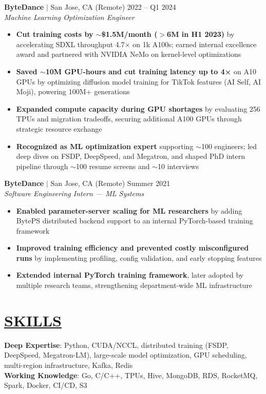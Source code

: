\documentclass[overlapped,line,11pt]{res}
\begin{document}
\begin{resume}
\textbf{ByteDance} $|$ San Jose, CA (Remote) \hfill 2022 -- Q1 2024\\
{\sl Machine Learning Optimization Engineer}
\begin{itemize} \itemsep 2pt
  \item \textbf{Cut training costs by $\sim$\$1.5M/month ($>$6M in H1 2023)} by accelerating SDXL throughput 4.7× on 1k A100s; earned internal excellence award and partnered with NVIDIA NeMo on kernel-level optimizations
  \item \textbf{Saved $\sim$10M GPU-hours and cut training latency up to 4×} on A10 GPUs by optimizing diffusion model training for TikTok features (AI Self, AI Moji), powering 100M+ generations
  \item \textbf{Expanded compute capacity during GPU shortages} by evaluating 256 TPUs and migration tradeoffs, securing additional A100 GPUs through strategic resource exchange
  \item \textbf{Recognized as ML optimization expert} supporting $\sim$100 engineers; led deep dives on FSDP, DeepSpeed, and Megatron, and shaped PhD intern pipeline through $\sim$100 resume screens and $\sim$10 interviews
\end{itemize}



\textbf{ByteDance} $|$ San Jose, CA (Remote) \hfill Summer 2021\\
{\sl Software Engineering Intern — ML Systems}
\begin{itemize} \itemsep 2pt
  \item \textbf{Enabled parameter-server scaling for ML researchers} by adding BytePS distributed backend support to an internal PyTorch-based training framework
  \item \textbf{Improved training efficiency and prevented costly misconfigured runs} by implementing profiling, config validation, and early stopping features
  \item \textbf{Extended internal PyTorch training framework}, later adopted by multiple research teams, strengthening department-wide ML infrastructure

\end{itemize}

\section{\underline{SKILLS}}
\textbf{Deep Expertise}: Python, CUDA/NCCL, distributed training (FSDP, DeepSpeed, Megatron-LM), large-scale model optimization, GPU scheduling, multi-region infrastructure, Kafka, Redis \\
\textbf{Working Knowledge}: Go, C/C++, TPUs, Hive, MongoDB, RDS, RocketMQ, Spark, Docker, CI/CD, S3


\end{resume}
\end{document}
